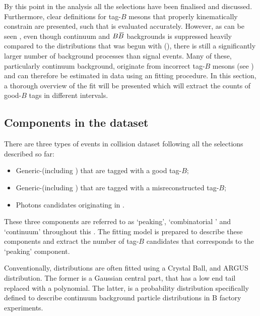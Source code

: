 By this point in the analysis all the selections have been finalised and discussed.
Furthermore, clear definitions for tag-$B$ mesons that properly kinematically constrain \BtoXsgamma are presented, such that \EB is evaluated accurately.
However, as can be seen , even though continuum and $B\kern 0.18em\overline{\kern -0.18em B}{}$ backgrounds is suppressed heavily compared to the \EB distributions that was begun with (),
there is still a significantly larger number of background processes than \BtoXsgamma signal events.
Many of these, particularly continuum background, originate from incorrect tag-$B$ mesons (see ) and can therefore be estimated in data using an \Mbc fitting procedure.
In this section, a thorough overview of the \Mbc fit will be presented which will extract the counts of good-$B$ tags in different \EB intervals.

\subsection{Components in the dataset}\label{sec:fitting_components}

There are three types of events in \epem collision dataset following all the selections described so far:
\begin{itemize}
    \item Generic-\BB (including \BtoXsgamma) that are tagged with a good tag-$B$;
    \item Generic-\BB (including \BtoXsgamma) that are tagged with a misreconstructed tag-$B$;
    \item Photons candidates originating in \epem\ra\qqbar.
\end{itemize}
These three components are referred to as `peaking', `combinatorial \BB' and `continuum' throughout this .
The fitting model is prepared to describe these components and extract the number of tag-$B$ candidates that corresponds to the `peaking' component.

Conventionally, \Mbc distributions are often fitted using a Crystal Ball, and ARGUS distribution. 
The former is a Gaussian central part, that has a low end tail replaced with a polynomial. 
The latter, is a probability distribution specifically defined to describe continuum background particle distributions in B factory experiments.


